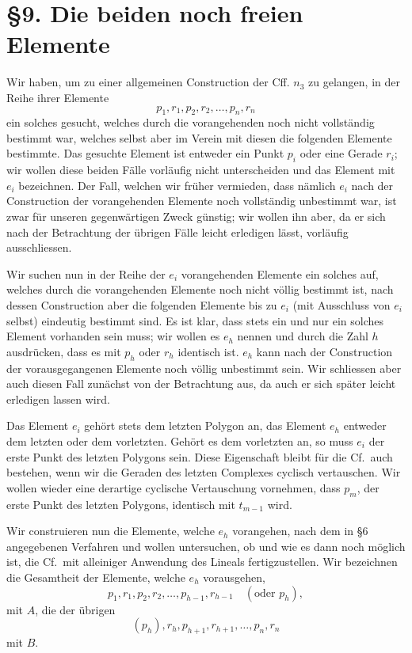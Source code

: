 \documentclass[11pt]{article}
\newcommand{\Cf}{\textup{Cf.}}
\begin{document}
\section*{\S 9. Die beiden noch freien Elemente}
Wir haben, um zu einer allgemeinen Construction der Cff. $n_3$ zu gelangen, in der Reihe ihrer Elemente
\[
p_1,r_1,p_2,r_2,\ldots,p_n,r_n
\]
ein solches gesucht, welches durch die vorangehenden noch nicht vollständig bestimmt war, welches selbst aber im Verein mit diesen die folgenden Elemente bestimmte. Das gesuchte Element ist entweder ein Punkt $p_i$ oder eine Gerade $r_i$; wir wollen diese beiden Fälle vorläufig nicht unterscheiden und das Element mit $e_i$ bezeichnen. Der Fall, welchen wir früher vermieden, dass nämlich $e_i$ nach der Construction der vorangehenden Elemente noch vollständig unbestimmt war, ist zwar für unseren gegenwärtigen Zweck günstig; wir wollen ihn aber, da er sich nach der Betrachtung der übrigen Fälle leicht erledigen lässt, vorläufig ausschliessen.

Wir suchen nun in der Reihe der $e_i$ vorangehenden Elemente ein solches auf, welches durch die vorangehenden Elemente noch nicht völlig bestimmt ist, nach dessen Construction aber die folgenden Elemente bis zu $e_i$ (mit Ausschluss von $e_i$ selbst) eindeutig bestimmt sind. Es ist klar, dass stets ein und nur ein solches Element vorhanden sein muss; wir wollen es $e_h$ nennen und durch die Zahl $h$ ausdrücken, dass es mit $p_h$ oder $r_h$ identisch ist. $e_h$ kann nach der Construction der vorausgegangenen Elemente noch völlig unbestimmt sein. Wir schliessen aber auch diesen Fall zunächst von der Betrachtung aus, da auch er sich später leicht erledigen lassen wird.

Das Element $e_i$ gehört stets dem letzten Polygon an, das Element $e_h$ entweder dem letzten oder dem vorletzten. Gehört es dem vorletzten an, so muss $e_i$ der erste Punkt des letzten Polygons sein. Diese Eigenschaft bleibt für die \Cf\ auch bestehen, wenn wir die Geraden des letzten Complexes cyclisch vertauschen. Wir wollen wieder eine derartige cyclische Vertauschung vornehmen, dass $p_m$, der erste Punkt des letzten Polygons, identisch mit $t_{m-1}$ wird.

Wir construieren nun die Elemente, welche $e_h$ vorangehen, nach dem in \S 6 angegebenen Verfahren und wollen untersuchen, ob und wie es dann noch möglich ist, die \Cf\ mit alleiniger Anwendung des Lineals fertigzustellen. Wir bezeichnen die Gesamtheit der Elemente, welche $e_h$ vorausgehen,
\[
p_1,r_1,p_2,r_2,\ldots,p_{h-1},r_{h-1}\quad (\text{oder }p_h),
\]
mit $A$, die der übrigen
\[
(p_h),r_h,p_{h+1},r_{h+1},\ldots,p_n,r_n
\]
mit $B$.
\end{document}
